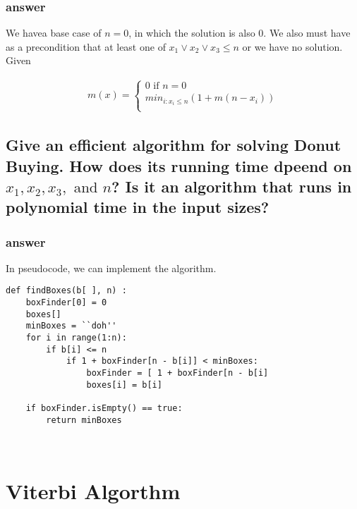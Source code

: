 \documentclass[titlepage]{article}\usepackage[]{graphicx}\usepackage[]{color}
\begin{document}
\subsubsection{answer}
We havea base case of $n=0$, in which the solution is also 0. We also must have
as a precondition that at least one of $x_1 \lor x_2 \lor x_3 \leq n $ or we have
no solution. Given

\begin{align*}
	m(x) = \begin{cases}
		0 \text{ if } n = 0 \\
		min_{i:x_i \leq n} \left(1 + m(n - x_i)\right) \\
	\end{cases}
\end{align*}



\subsection{ Give an efficient algorithm for solving Donut Buying. How does its
  running time dpeend on $x_1, x_2, x_3,\text{ and } n$? Is it an algorithm
that runs in polynomial time in the input sizes?} 

\subsubsection{answer}
In pseudocode, we can implement the algorithm. 

\begin{lstlisting}
def findBoxes(b[ ], n) :
	boxFinder[0] = 0 
	boxes[]
	minBoxes = ``doh''
	for i in range(1:n):
		if b[i] <= n
			if 1 + boxFinder[n - b[i]] < minBoxes:
				boxFinder = [ 1 + boxFinder[n - b[i]
				boxes[i] = b[i]

	if boxFinder.isEmpty() == true: 
		return minBoxes



\end{lstlisting}



\section{Viterbi Algorthm}
\end{document}
